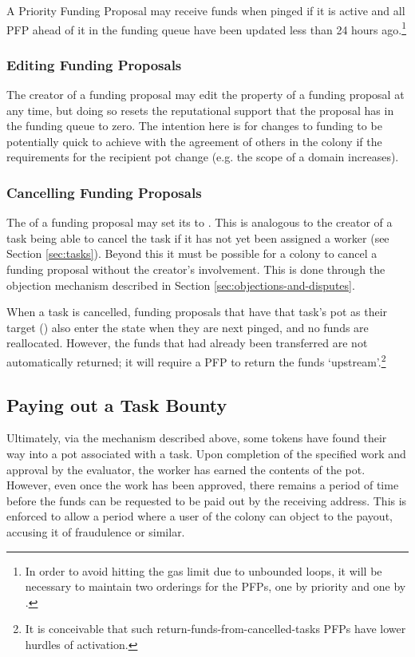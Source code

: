 A Priority Funding Proposal may receive funds when pinged if it is active and all PFP ahead of it in the funding queue have been updated less than 24 hours ago.\footnote{In order to avoid hitting the gas limit due to unbounded loops, it will be necessary to maintain two orderings for the PFPs, one by priority and one by . }

\subsubsection{Editing Funding Proposals}
The creator of a funding proposal may edit the  property of a funding proposal at any time, but doing so resets the reputational support that the proposal has in the funding queue to zero. The intention here is for changes to funding to be potentially quick to achieve with the agreement of others in the colony if the requirements for the recipient pot change (e.g. the scope of a domain increases).

\subsubsection{Cancelling Funding Proposals}
The  of a funding proposal may set its  to . This is analogous to the creator of a task being able to cancel the task if it has not yet been assigned a worker (see Section \ref{sec:tasks}). Beyond this it must be possible for a colony to cancel a funding proposal without the creator's involvement. This is done through the objection mechanism described in Section \ref{sec:objections-and-disputes}.

When a task is cancelled, funding proposals that have that task's pot as their target () also enter the  state when they are next pinged, and no funds are reallocated. However, the funds that had already been transferred are not automatically returned; it will require a PFP to return the funds `upstream'.\footnote{It is conceivable that such return-funds-from-cancelled-tasks PFPs have lower hurdles of activation.}

\subsection{Paying out a Task Bounty}\label{sec:claiming-bounty}
Ultimately, via the mechanism described above, some tokens have found their way into a pot associated with a task. Upon completion of the specified work and approval by the evaluator, the worker has earned the contents of the pot. However, even once the work has been approved, there remains a period of time before the funds can be requested to be paid out by the receiving address. This is enforced to allow a period where a user of the colony can object to the payout, accusing it of fraudulence or similar.

